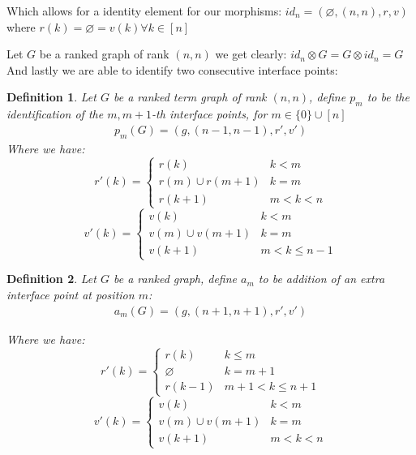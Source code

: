 \documentclass[12pt]{article}
\newtheorem{definition}{Definition}
\newcommand{\1}{\mathbbm{1}}
\begin{document}
Which allows for a identity element for our morphisms:
$id_n = (\varnothing, (n, n), r, v)$ where $r(k) = \varnothing = v(k) \forall k\in[n]$

Let $G$ be a ranked graph of rank $(n,n)$ we get clearly: $id_n \otimes G = G\otimes id_n = G$\\

And lastly we are able to identify two consecutive interface points:

\begin{definition}
    Let $G$ be a ranked term graph of rank $(n,n)$, define $p_m$ to be the identification of the $m, m+1$-th interface points, for $m\in\{0\}\cup[n]$
    \begin{align*}
        p_m(G) = (g, (n-1, n-1), r', v')
    \end{align*}
    Where we have:
    \[
    r'(k) = \begin{cases}
        r(k) & k < m\\
        r(m) \cup r(m+1) & k = m\\
        r(k + 1) & m < k < n
    \end{cases}
    \]
        \[
    v'(k) = \begin{cases}
        v(k) & k < m\\
        v(m) \cup v(m+1) & k = m\\
        v(k + 1) & m < k \leq n - 1
    \end{cases}
    \]
\end{definition}

\begin{definition}
    Let $G$ be a ranked graph, define $a_m$ to be addition of an extra interface point at position $m$:
        \begin{align*}
        a_m(G) = (g, (n+1, n+1), r', v')
    \end{align*}

        Where we have:
    \[
    r'(k) = \begin{cases}
        r(k) & k \leq m\\
        \varnothing & k = m+1\\
        r(k - 1) & m + 1 < k \leq n+1
    \end{cases}
    \]
        \[
    v'(k) = \begin{cases}
        v(k) & k < m\\
        v(m) \cup v(m+1) & k = m\\
        v(k + 1) & m < k < n
    \end{cases}
    \]
\end{definition}
\end{document}
